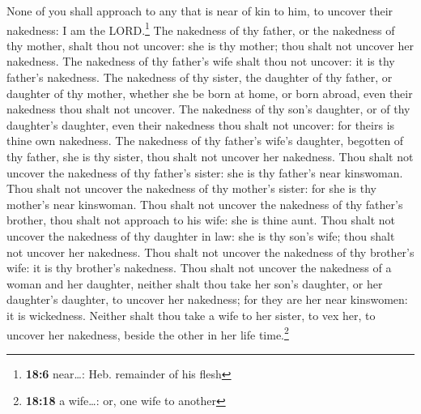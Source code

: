  None of you shall approach to any that is near of kin to
him, to uncover their nakedness: I am the LORD.\footnote{\textbf{18:6}
  near\ldots: Heb. remainder of his flesh}  The nakedness
of thy father, or the nakedness of thy mother, shalt thou not uncover:
she is thy mother; thou shalt not uncover her nakedness. 
The nakedness of thy father's wife shalt thou not uncover: it is thy
father's nakedness.  The nakedness of thy sister, the
daughter of thy father, or daughter of thy mother, whether she be born
at home, or born abroad, even their nakedness thou shalt not uncover.
 The nakedness of thy son's daughter, or of thy
daughter's daughter, even their nakedness thou shalt not uncover: for
theirs is thine own nakedness.  The nakedness of thy
father's wife's daughter, begotten of thy father, she is thy sister,
thou shalt not uncover her nakedness.  Thou shalt not
uncover the nakedness of thy father's sister: she is thy father's near
kinswoman.  Thou shalt not uncover the nakedness of thy
mother's sister: for she is thy mother's near kinswoman. 
Thou shalt not uncover the nakedness of thy father's brother, thou shalt
not approach to his wife: she is thine aunt.  Thou shalt
not uncover the nakedness of thy daughter in law: she is thy son's wife;
thou shalt not uncover her nakedness.  Thou shalt not
uncover the nakedness of thy brother's wife: it is thy brother's
nakedness.  Thou shalt not uncover the nakedness of a
woman and her daughter, neither shalt thou take her son's daughter, or
her daughter's daughter, to uncover her nakedness; for they are her near
kinswomen: it is wickedness.  Neither shalt thou take a
wife to her sister, to vex her, to uncover her nakedness, beside the
other in her life time.\footnote{\textbf{18:18} a wife\ldots: or, one
  wife to another}

